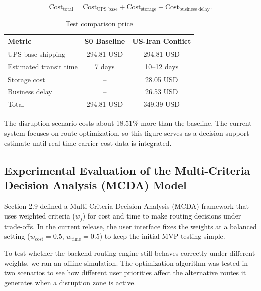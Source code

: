 \begin{equation}
\text{Cost}_{\text{total}} = \text{Cost}_{\text{UPS base}} + \text{Cost}_{\text{storage}} + \text{Cost}_{\text{business delay}}.
\end{equation}

\begin{table}[H]
\centering
\caption{Test comparison price}
\begin{tabular}{lcc}
\toprule
\textbf{Metric} & \textbf{S0 Baseline} & \textbf{US-Iran Conflict}\\
\midrule
UPS base shipping & 294.81 USD & 294.81 USD\\
Estimated transit time & 7 days & 10--12 days\\
Storage cost & -- & 28.05 USD\\
Business delay & -- & 26.53 USD\\
Total & 294.81 USD & 349.39 USD\\
\bottomrule
\end{tabular}
\end{table}

The disruption scenario costs about 18.51\% more than the baseline. The current system focuses on route optimization, so this figure serves as a decision-support estimate until real-time carrier cost data is integrated.

\subsection{Experimental Evaluation of the Multi-Criteria Decision Analysis (MCDA) Model}

Section 2.9 defined a Multi-Criteria Decision Analysis (MCDA) framework that uses weighted criteria ($w_j$) for cost and time to make routing decisions under trade-offs. In the current release, the user interface fixes the weights at a balanced setting ($w_{\text{cost}} = 0.5$, $w_{\text{time}} = 0.5$) to keep the initial MVP testing simple.

To test whether the backend routing engine still behaves correctly under different weights, we ran an offline simulation. The optimization algorithm was tested in two scenarios to see how different user priorities affect the alternative routes it generates when a disruption zone is active.

